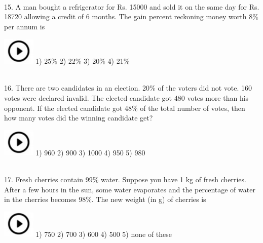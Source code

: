 \documentclass{article}
\begin{document}
\noindent \\
15. A man bought a refrigerator for Rs. 15000 and sold it on the same day for Rs. 18720 allowing a credit of 6 months. The gain percent reckoning money worth 8\% per annum is

\noindent   \includegraphics*[width=0.60in, height=0.52in]{images/image1}  1) 25\%                    2) 22\%              3) 20\%              4) 21\%

\noindent \\


16. There are two candidates in an election. 20\% of the voters did not vote. 160 votes were declared invalid. The elected candidate got 480 votes more than his opponent. If the elected candidate got 48\% of the total number of votes, then how many votes did the winning candidate get?

\noindent 

\noindent   \includegraphics*[width=0.60in, height=0.52in]{images/image1}  1) 960                      2) 900               3) 1000             4) 950               5) 980

\noindent 

\noindent 

\noindent \\


17. Fresh cherries contain 99\% water. Suppose you have 1 kg of fresh cherries. After a few hours in the sun, some water evaporates and the percentage of water in the cherries becomes 98\%. The new weight (in g) of cherries is

\noindent 

\noindent   \includegraphics*[width=0.60in, height=0.52in]{images/image1}  1) 750                      2) 700               3) 600               4) 500               5) none of these

\noindent 

\noindent 

\noindent \\
\end{document}
